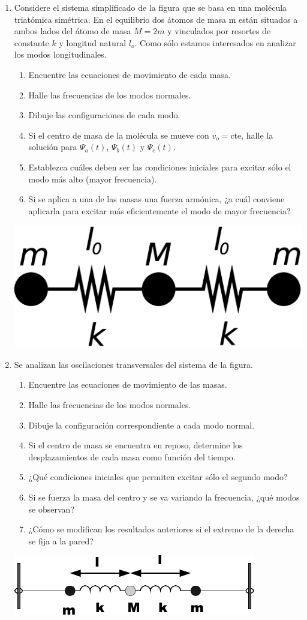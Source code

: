 \documentclass[11pt,spanish,a4paper]{article}
\begin{document}
\begin{enumerate}
\item
	Considere el sistema simplificado de la figura que se basa en una molécula triatómica simétrica.
	En el equilibrio dos átomos de masa m están situados a ambos lados del átomo de masa \(M=2m\) y vinculados por resortes de constante \(k\) y longitud natural \(l_o\).
	Como sólo estamos interesados en analizar los modos longitudinales.
	\begin{enumerate}
		\item Encuentre las ecuaciones de movimiento de cada masa.
		\item Halle las frecuencias de los modos normales.
		\item Dibuje las configuraciones de cada modo.
		\item Si el centro de masa de la molécula se mueve con \(v_o=\mathrm{cte}\), halle la solución para \(\Psi_a(t)\), \(\Psi_b(t)\) y \(\Psi_c(t)\).
		\item Establezca cuáles deben ser las condiciones iniciales para excitar sólo el modo más alto (mayor frecuencia).
		\item Si se aplica a una de las masas una fuerza armónica, ¿a cuál conviene aplicarla para excitar más eficientemente el modo de mayor frecuencia?
	\end{enumerate}
	\begin{center}
	\includegraphics[width=0.2\linewidth]{ej1-9}
	\end{center}


\item Se analizan las oscilaciones transversales del sistema de la figura.
	\begin{enumerate}
		\item Encuentre las ecuaciones de movimiento de las masas.
		\item Halle las frecuencias de los modos normales.
		\item Dibuje la configuración correspondiente a cada modo normal.
		\item Si el centro de masa se encuentra en reposo, determine los desplazamientos de cada masa como función del tiempo.
		\item ¿Qué condiciones iniciales que permiten excitar sólo el segundo modo?
		\item Si se fuerza la masa del centro y se va variando la frecuencia, ¿qué modos se observan?
		\item ¿Cómo se modifican los resultados anteriores si el extremo de la derecha se fija a la pared?
	\end{enumerate}
	\begin{center}
		\includegraphics[width=0.4\linewidth]{g02e04}
	\end{center}


\end{enumerate}
\end{document}
